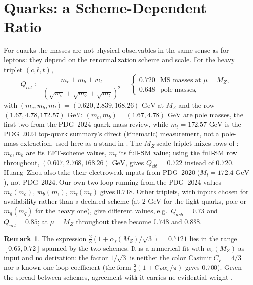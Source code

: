 \documentclass[11pt,reqno]{amsart}
\theoremstyle{definition}
\newtheorem{remark}[theorem]{Remark}
\begin{document}
\section{Quarks: a Scheme-Dependent Ratio}\label{sec:quark}

For quarks the masses are not physical observables in the same sense as for leptons: they depend on the renormalization scheme and scale. For the heavy triplet $(c, b, t)$,
\begin{equation}
    Q_{cbt} \coloneqq \frac{m_c + m_b + m_t}{\left(\sqrt{m_c} + \sqrt{m_b} + \sqrt{m_t}\right)^2}
    = \begin{cases}
        0.720 & \overline{\mathrm{MS}} \text{ masses at } \mu = M_Z,\\
        0.648 & \text{pole masses},
    \end{cases}
\end{equation}
with $(m_c, m_b, m_t) = (0.620, 2.839, 168.26)\text{ GeV}$ at $M_Z$ \cite{huang2021precise} and the row $(1.67, 4.78, 172.57)\text{ GeV}$: $(m_c, m_b) = (1.67, 4.78)\text{ GeV}$ are pole masses, the first two from the PDG~2024 quark-mass review, while $m_t = 172.57\text{ GeV}$ is the PDG~2024 top-quark summary's direct (kinematic) measurement, not a pole-mass extraction, used here as a stand-in \cite{pdg2024}. The $M_Z$-scale triplet mixes rows of \cite{huang2021precise}: $m_c, m_b$ are its EFT-scheme values, $m_t$ its full-SM value; using the full-SM row throughout, $(0.607, 2.768, 168.26)\text{ GeV}$, gives $Q_{cbt} = 0.722$ instead of $0.720$. Huang--Zhou also take their electroweak inputs from PDG~2020 ($M_t = 172.4\text{ GeV}$), not PDG~2024. Our own two-loop running from the PDG~2024 values $m_c(m_c)$, $m_b(m_b)$, $m_t(m_t)$ gives $0.718$. Other triplets, with inputs chosen for availability rather than a declared scheme (at $2\text{ GeV}$ for the light quarks, pole or $m_q(m_q)$ for the heavy one), give different values, e.g.\ $Q_{dsb} = 0.73$ and $Q_{uct} = 0.85$; at $\mu = M_Z$ throughout \cite{huang2021precise} these become $0.748$ and $0.888$.

\begin{remark}
The expression $\frac23\left(1 + \alpha_s(M_Z)/\sqrt3\right) = 0.7121$ lies in the range $[0.65, 0.72]$ spanned by the two schemes. It is a numerical fit with $\alpha_s(M_Z)$ as input and no derivation: the factor $1/\sqrt3$ is neither the color Casimir $C_F = 4/3$ nor a known one-loop coefficient (the form $\frac23(1 + C_F\alpha_s/\pi)$ gives $0.700$). Given the spread between schemes, agreement with it carries no evidential weight \cite[Ch.~12, Sec.~7]{silvafilho2026book}.
\end{remark}
\end{document}

